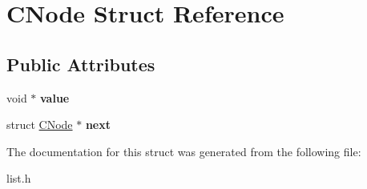 \hypertarget{structCNode}{\section{C\-Node Struct Reference}
\label{structCNode}
}
\subsection*{Public Attributes}
\begin{DoxyCompactItemize}
\item 
\hypertarget{structCNode_a8fa0574b2f33035ba89a1da8ba59fec5}{void $\ast$ {\bfseries value}}\label{structCNode_a8fa0574b2f33035ba89a1da8ba59fec5}

\item 
\hypertarget{structCNode_a4546864aabdf3183c7f11bf9eae5facd}{struct \hyperlink{structCNode}{C\-Node} $\ast$ {\bfseries next}}\label{structCNode_a4546864aabdf3183c7f11bf9eae5facd}

\end{DoxyCompactItemize}


The documentation for this struct was generated from the following file\-:\begin{DoxyCompactItemize}
\item 
list.\-h\end{DoxyCompactItemize}
